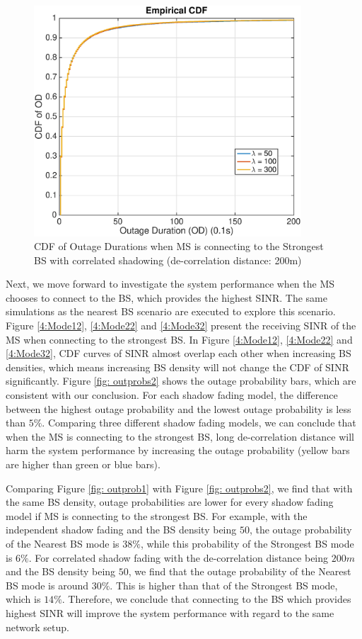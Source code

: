  \begin{figure}
 \centering
 \includegraphics[width=10cm]{ODthresh-5DeCorr200MaxMode2.eps}
 \caption{CDF of Outage Durations when MS is connecting to the Strongest BS with correlated shadowing (de-correlation distance: 200m)}
 \label{corr2}
 \end{figure}
 \par Next, we move forward to investigate the system performance when the MS chooses to connect to the BS, which provides the highest SINR. The same simulations as the nearest BS scenario are executed to explore this scenario. Figure \ref{4:Mode12}, \ref{4:Mode22} and \ref{4:Mode32} present the receiving SINR of the MS when connecting to the strongest BS. In Figure \ref{4:Mode12}, \ref{4:Mode22} and \ref{4:Mode32}, CDF curves of SINR almost overlap each other when increasing BS densities, which means increasing BS density will not change the CDF of SINR significantly. Figure \ref{fig: outprobs2} shows the outage probability bars, which are consistent with our conclusion. For each shadow fading model, the difference between the highest outage probability and the lowest outage probability is less than $5\%$. Comparing three different shadow fading models, we can conclude that when the MS is connecting to the strongest BS, long de-correlation distance will harm the system performance by increasing the outage probability (yellow bars are higher than green or blue bars). 
 \par Comparing Figure \ref{fig: outprob1} with Figure \ref{fig: outprobs2}, we find that with the same BS density, outage probabilities are lower for every shadow fading model if MS is connecting to the strongest BS. For example, with the independent shadow fading and the BS density being $50$, the outage probability of the Nearest BS mode is $38\%$, while this probability of the Strongest BS mode is $6\%$. For correlated shadow fading with the de-correlation distance being $200m$ and the BS density being $50$, we find that the outage probability of the Nearest BS mode is around $30\%$. This is higher than that of the Strongest BS mode, which is $14\%$. Therefore, we conclude that connecting to the BS which provides highest SINR will improve the system performance with regard to the same network setup. 








